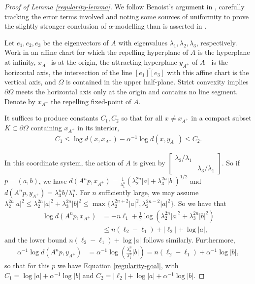 \documentclass[12pt,a4paper]{amsart}
\theoremstyle{definition}
\theoremstyle{plain}
\numberwithin{equation}{section}
\begin{document}
\begin{proof}[Proof of Lemma \ref{regularity-lemma}]
    We follow Benoist's argument in \cite{benoist2004convexesI}, carefully tracking the error terms involved and noting some sources of uniformity to prove the slightly stronger conclusion of $\alpha$-modelling than is asserted in \cite{benoist2004convexesI}. 

    Let $e_1, e_2, e_3$ be the eigenvectors of $A$ with eigenvalues $\lambda_1, \lambda_2, \lambda_3$, respectively. Work in an affine chart for which the repelling hyperplane of $A$ is the hyperplane at infinity, $x_{A^+}$ is at the origin, the attracting hyperplane $y_{A^+}$ of $A^+$ is the horizontal axis, the intersection of the line $\overline{[e_1][e_3]}$ with this affine chart is the vertical axis, and $\Omega$ is contained in the upper half-plane. Strict convexity implies $\partial \Omega$ meets the horizontal axis only at the origin and contains no line segment. Denote by $x_{A^{-}}$ the repelling fixed-point of $A$.
    
    It suffices to produce constants $C_1, C_2$ so that for all $x \neq x_{A^+}$ in a compact subset $K \subset \partial \Omega$ containing $x_{A^+}$ in its interior, \begin{align}\label{regularity-goal} C_1 \leq \log {{d(x, x_{A^+})}} - \alpha^{-1}\log d(x, y_{A^+}) \leq C_2.\end{align}
    
    In this coordinate system, the action of $A$ is given by $\begin{bmatrix} \lambda_2/\lambda_1 & \, \\ \, & \lambda_3/\lambda_1 \end{bmatrix}$. So if $p = (a,b)$, we have $d (A^n p, x_{A^+}) = \frac{1}{\lambda_1^n} (\lambda_2^{2n} |a| + \lambda_3^{2n} |b|)^{1/2}$ and $d(A^np, y_{A^+}) = \lambda_3^{n} b/\lambda_1^n$. For $n$ sufficiently large, we may assume $\lambda_2^{2n}|a|^2 \leq \lambda_2^{2n} |a|^2 + \lambda_3^{2n}|b|^2 \leq \max \{\lambda_{2}^{2n+2}|a|^2, \lambda_2^{2n-2}|a|^2 \}$. So we have that \begin{align*} \log d(A^np, x_{A^+}) &= -{n} \ell_1 + \frac{1}{2} \log ( \lambda_2^{2n} |a|^2 + \lambda_3^{2n}|b|^2) \\ & \leq n(\ell_2 - \ell_1) + |\ell_2 | + \log |a|,
     \end{align*} and the lower bound $n (\ell_2 - \ell_1) + \log |a|$ follows similarly. Furthermore, \begin{align*}
        \alpha^{-1} \log d(A^np, y_{A^+}) &= \alpha^{-1} \log \left( \frac{\lambda_3^n}{\lambda_1^n} |b| \right) = n (\ell_2 - \ell_1) + \alpha^{-1} \log |b|,
     \end{align*} so that for this $p$ we have Equation \ref{regularity-goal}, with $C_1 = \log |a| + \alpha^{-1} \log |b|$ and $C_2 = |\ell_2| + \log|a| + \alpha^{-1} \log |b|$.


\end{proof}
\end{document}
